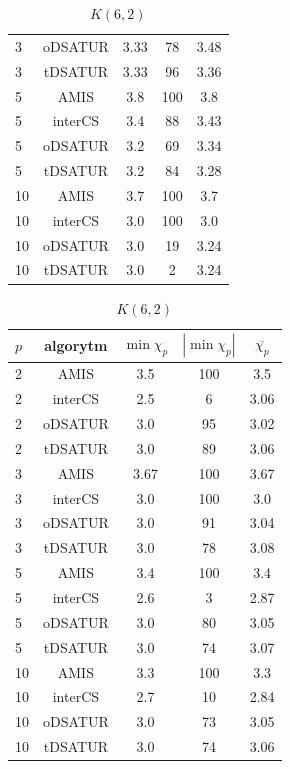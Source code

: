 \documentclass[10pt,a4paper]{article}
\begin{document}
\begin{table}[H]
\begin{minipage}{.5\linewidth}
\begin{tabular}{|l|c|c|c|c|}
				3 & oDSATUR & 3.33 & 78 & 3.48 \\
				3 & tDSATUR & 3.33 & 96 & 3.36 \\
				\hline
				5 & AMIS & 3.8 & 100 & 3.8 \\
				5 & interCS & 3.4 & 88 & 3.43 \\
				5 & oDSATUR & 3.2 & 69 & 3.34 \\
				5 & tDSATUR & 3.2 & 84 & 3.28 \\
				\hline
				10 & AMIS & 3.7 & 100 & 3.7 \\
				10 & interCS & 3.0 & 100 & 3.0 \\
				10 & oDSATUR & 3.0 & 19 & 3.24 \\
				10 & tDSATUR & 3.0 & 2 & 3.24 \\
				\hline
			\end{tabular}
			\caption{$K(6,2)$}
		\end{minipage} 
		\begin{minipage}{.5\linewidth}
			\centering
			\begin{tabular}{|l|c|c|c|c|}
				\hline
				\textbf{$p$} & \textbf{algorytm} & \textbf{$\min \chi_{p}$} & \textbf{$|\min \chi_{p}|$} & \textbf{$\overline{\chi_{p}}$} \\
				\hline
				2 & AMIS & 3.5 & 100 & 3.5 \\
				2 & interCS & 2.5 & 6 & 3.06 \\
				2 & oDSATUR & 3.0 & 95 & 3.02 \\
				2 & tDSATUR & 3.0 & 89 & 3.06 \\
				\hline
				3 & AMIS & 3.67 & 100 & 3.67 \\
				3 & interCS & 3.0 & 100 & 3.0 \\
				3 & oDSATUR & 3.0 & 91 & 3.04 \\
				3 & tDSATUR & 3.0 & 78 & 3.08 \\
				\hline
				5 & AMIS & 3.4 & 100 & 3.4 \\
				5 & interCS & 2.6 & 3 & 2.87 \\
				5 & oDSATUR & 3.0 & 80 & 3.05 \\
				5 & tDSATUR & 3.0 & 74 & 3.07 \\
				\hline
				10 & AMIS & 3.3 & 100 & 3.3 \\
				10 & interCS & 2.7 & 10 & 2.84 \\
				10 & oDSATUR & 3.0 & 73 & 3.05 \\
				10 & tDSATUR & 3.0 & 74 & 3.06 \\
				\hline
			\end{tabular}

\end{minipage}
\end{table}
\end{document}
